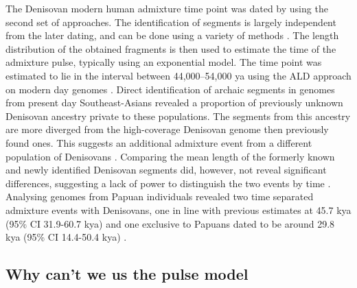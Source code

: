 \documentclass[]{article}
\begin{document}
The Denisovan modern human admixture time point was dated by using the second set of approaches. The identification of segments is largely independent from the later dating, and can be done using a variety of methods \citep{racimo_signatures_2017,seguin_orlando_paleogenomics_2014,vernot_excavating_2016,sankararaman_combined_2016,skov_detecting_2018}. The length distribution of the obtained fragments is then used to estimate the time of the admixture pulse, typically using an exponential model.
The time point was estimated to lie in the interval between 44,000--54,000 ya using the ALD
approach on modern day genomes \citep{sankararaman_combined_2016}. Direct identification of archaic segments in genomes from present day Southeast-Asians revealed a proportion of previously unknown Denisovan ancestry private to these populations. The segments from this ancestry are more diverged from the high-coverage Denisovan genome then previously found ones. This suggests an additional admixture event from a different population of Denisovans \citep{browning_analysis_2018}.
Comparing the mean length of the formerly known and newly identified Denisovan segments did, however, not reveal significant differences, suggesting a lack of power to distinguish the
two events by time \citep{browning_analysis_2018,jacobs_multiple_2019}. Analysing genomes from Papuan individuals revealed two time separated admixture events with Denisovans, one in line with previous estimates at 45.7 kya (95\% CI 31.9-60.7 kya) and one exclusive to Papuans dated to
be around 29.8 kya (95\% CI 14.4-50.4 kya) \citep{jacobs_multiple_2019}.


\subsection{Why can't we us the pulse model}\label{Why can't we us the pulse model}
\end{document}
